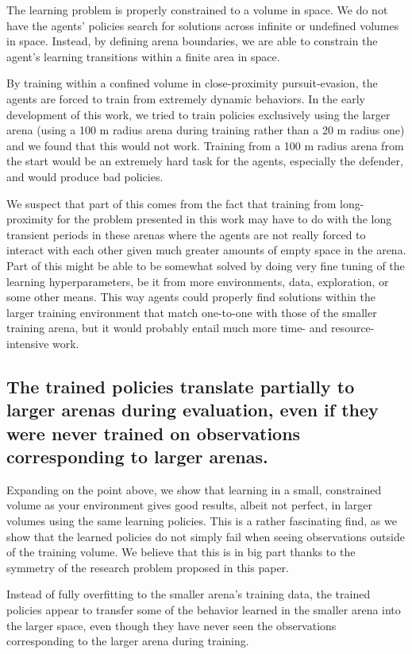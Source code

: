 The learning problem is properly constrained to a volume in space. We do not have the agents' policies search for solutions across infinite or undefined volumes in space. Instead, by defining arena boundaries, we are able to constrain the agent's learning transitions within a finite area in space.

By training within a confined volume in close-proximity pursuit-evasion, the agents are forced to train from extremely dynamic behaviors. In the early development of this work, we tried to train policies exclusively using the larger arena (using a 100 m radius arena during training rather than a 20 m radius one) and we found that this would not work. Training from a 100 m radius arena from the start would be an extremely hard task for the agents, especially the defender, and would produce bad policies.

We suspect that part of this comes from the fact that training from long-proximity for the problem presented in this work may have to do with the long transient periods in these arenas where the agents are not really forced to interact with each other given much greater amounts of empty space in the arena. Part of this might be able to be somewhat solved by doing very fine tuning of the learning hyperparameters, be it from more environments, data, exploration, or some other means. This way agents could properly find solutions within the larger training environment that match one-to-one with those of the smaller training arena, but it would probably entail much more time- and resource-intensive work.



\subsection*{The trained policies translate partially to larger arenas during evaluation, even if they were never trained on observations corresponding to larger arenas.}


Expanding on the point above, we show that learning in a small, constrained volume as your environment gives good results, albeit not perfect, in larger volumes using the same learning policies. This is a rather fascinating find, as we show that the learned policies do not simply fail when seeing observations outside of the training volume. We believe that this is in big part thanks to the symmetry of the research problem proposed in this paper.

Instead of fully overfitting to the smaller arena's training data, the trained policies appear to transfer some of the behavior learned in the smaller arena into the larger space, even though they have never seen the observations corresponding to the larger arena during training.

